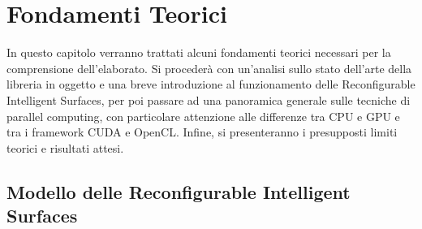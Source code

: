 \chapter{Fondamenti Teorici}
\label{ch:fondamenti}

In questo capitolo verranno trattati alcuni fondamenti teorici necessari per la
comprensione dell'elaborato. Si procederà con un'analisi sullo stato dell'arte della
libreria in oggetto e una breve introduzione al funzionamento delle Reconfigurable
Intelligent Surfaces, per poi passare ad una panoramica generale sulle tecniche
di parallel computing, con particolare attenzione alle differenze tra CPU e GPU e
tra i framework CUDA e OpenCL. Infine, si presenteranno i presupposti limiti teorici
e risultati attesi.

\section[Modello delle Reconfigurable Intelligent Surfaces]{Modello delle
Reconfigurable Intelligent Surfaces\cite{cooperis}}
\label{sec:statodellarte}

